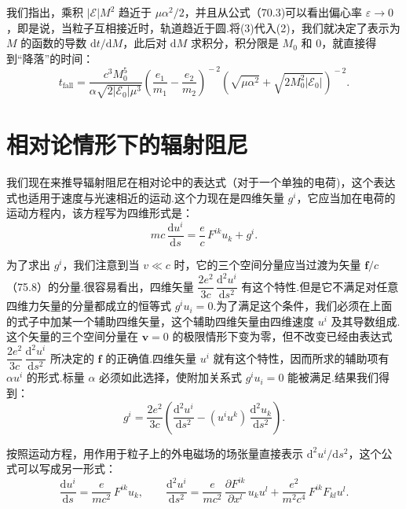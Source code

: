 \begin{xiti}
我们指出，乘积 $|\mathcal{E}|M^2$ 趋近于 $\mu\alpha^2/2$，并且从公式（70.3)可以看出偏心率 $\varepsilon\to 0$，即是说，当粒子互相接近时，轨道趋近于圆.将(3)代入(2)，我们就决定了表示为 $M$ 的函数的导数 $\mathrm{d}t/\mathrm{d}M$，此后对 $\mathrm{d}M$ 求积分，积分限是 $M_0$ 和 $0$，就直接得到“降落”的时间：
\begin{equation*}
  t_{\mathrm{fall}}=\frac{c^3M_0^5}{\alpha\sqrt{2|\mathcal{E}_0|\mu^3}}
  \left(\frac{e_1}{m_1}-\frac{e_2}{m_2}\right)^{\!-2}
  \left(\sqrt{\mu\alpha^2}+\sqrt{2M_0^2|\mathcal{E}_0|}\right)^{\!-2}.
\end{equation*}

\end{xiti}

\section{相对论情形下的辐射阻尼}

我们现在来推导辐射阻尼在相对论中的表达式（对于一个单独的电荷)，这个表达式也适用于速度与光速相近的运动.这个力现在是四维矢量 $g^i$，它应当加在电荷的运动方程内，该方程写为四维形式是：
\begin{equation}
  mc\,\frac{\mathrm{d}u^i}{\mathrm{d}s}=\frac{e}{c}\,F^{ik}u_k+g^i.
\end{equation}

为了求出 $g^i$，我们注意到当 $v\ll c$ 时，它的三个空间分量应当过渡为矢量 $\boldsymbol{f}/c$（75.8）的分量.很容易看出，四维矢量
$\dfrac{2e^2}{3c}\,\dfrac{\mathrm{d}^2u^i}{\mathrm{d}s^2}$
有这个特性.但是它不满足对任意四维力矢量的分量都成立的恒等式 $g^iu_i=0$.为了满足这个条件，我们必须在上面的式子中加某一个辅助四维矢量，这个辅助四维矢量由四维速度 $u^i$ 及其导数组成.这个矢量的三个空间分量在 $\boldsymbol{v}=0$ 的极限情形下变为零，但不改变已经由表达式
$\dfrac{2e^2}{3c}\,\dfrac{\mathrm{d}^2u^i}{\mathrm{d}s^2}$
所决定的 $\boldsymbol{f}$ 的正确值.四维矢量 $u^i$ 就有这个特性，因而所求的辅助项有 $\alpha u^i$ 的形式.标量 $\alpha$ 必须如此选择，使附加关系式 $g^iu_i=0$ 能被满足.结果我们得到：
\begin{equation}
  g^i=\frac{2e^2}{3c}\left(\frac{\mathrm{d}^2u^i}{\mathrm{d}s^2}
  -(u^iu^k)\,\frac{\mathrm{d}^2u_k}{\mathrm{d}s^2}\right).
\end{equation}

按照运动方程，用作用于粒子上的外电磁场的场张量直接表示 $\mathrm{d}^2u^i/\mathrm{d}s^2$，这个公式可以写成另一形式：
\begin{equation*}
  \frac{\mathrm{d}u^i}{\mathrm{d}s}=\frac{e}{mc^2}\,F^{ik}u_k,\qquad
  \frac{\mathrm{d}^2u^i}{\mathrm{d}s^2}
  =\frac{e}{mc^2}\,\frac{\partial F^{ik}}{\partial x^l}\,u_ku^l
  +\frac{e^2}{m^2c^4}\,F^{ik}F_{kl}u^l.
\end{equation*}

